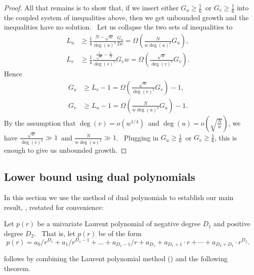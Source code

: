\begin{proof}
All that remains is to show that, if we insert either $G_{u}\geq\frac{1}{6}
$\ or $G_{v}\geq\frac{1}{6}$ into the coupled system of inequalities above,
then we get unbounded growth and the inequalities have no solution. \ Let us
collapse the two sets of inequalities to
\begin{align*}
L_{u}  &  \geq\frac{1}{4}\frac{N-\sqrt{w}}{\deg\left(  u\right)  ^{2}}
\frac{G_{u}}{2w}=\Omega\left(  \frac{N}{w\deg\left(  u\right)  ^{2}}
G_{u}\right)  ,\\
L_{v}  &  \geq\frac{1}{4}\frac{\frac{1}{\sqrt{w}}-\frac{1}{N}}{\deg\left(
v\right)  ^{2}}G_{v}w=\Omega\left(  \frac{\sqrt{w}}{\deg\left(  v\right)
^{2}}G_{v}\right)  .
\end{align*}
Hence
\begin{align*}
G_{u}  &  \geq L_{v}-1=\Omega\left(  \frac{\sqrt{w}}{\deg\left(  v\right)
^{2}}G_{v}\right)  -1,\\
G_{v}  &  \geq L_{u}-1=\Omega\left(  \frac{N}{w\deg\left(  u\right)  ^{2}
}G_{u}\right)  -1.
\end{align*}
By the assumption that $\deg\left(  v\right)  =o\left(  w^{1/4}\right)  $\ and
$\deg\left(  u\right)  =o\left(  \sqrt{\frac{N}{w}}\right)  $, we have
$\frac{\sqrt{w}}{\deg\left(  v\right)  ^{2}}\gg1$\ and $\frac{N}{w\deg\left(
u\right)  ^{2}}\gg1$. \ Plugging in $G_{u}\geq\frac{1}{6}$\ or $G_{v}\geq
\frac{1}{6}$, this is enough to give us unbounded growth.
\end{proof}

%
\subsection{Lower bound using dual polynomials}
\label{s:dualpoly}\label{sec:dualpoly}

In this section we use the method of dual polynomials to
establish our main result, , restated for convenience:

\main*

Let $p(r)$ be a univariate Laurent polynomial of negative degree $D_{1}$ and
positive degree $D_{2}$. \ That is, let $p(r)$ be of the form
\begin{equation}
p(r)=a_{0}/r^{D_{1}}+a_{1}/r^{D_{1}-1}+\dots
+a_{D_{1}-1}/r+a_{D_{1}}+a_{D_{1}+1}\cdot r+\cdots +a_{D_{2}+D_{1}}\cdot
r^{D_{2}}.
\end{equation}

 follows by combining the Laurent polynomial method () and the following
theorem.

